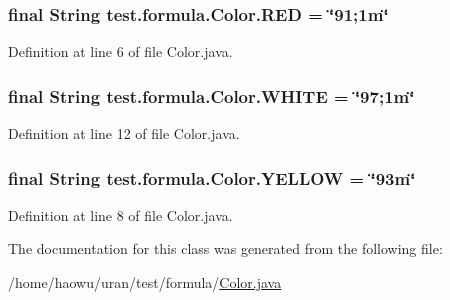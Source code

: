 \hypertarget{classtest_1_1formula_1_1_color_a0c3138b80e11d35744f6ab13c82edff3}{}
\subsubsection[{R\+E\+D}]{\setlength{\rightskip}{0pt plus 5cm}final String test.\+formula.\+Color.\+R\+E\+D = \char`\"{}91;1m\char`\"{}\hspace{0.3cm}{\ttfamily [static]}}\label{classtest_1_1formula_1_1_color_a0c3138b80e11d35744f6ab13c82edff3}


Definition at line 6 of file Color.\+java.

\hypertarget{classtest_1_1formula_1_1_color_a8154969ea2b235189b18cc4844eeb14d}{}
\subsubsection[{W\+H\+I\+T\+E}]{\setlength{\rightskip}{0pt plus 5cm}final String test.\+formula.\+Color.\+W\+H\+I\+T\+E = \char`\"{}97;1m\char`\"{}\hspace{0.3cm}{\ttfamily [static]}}\label{classtest_1_1formula_1_1_color_a8154969ea2b235189b18cc4844eeb14d}


Definition at line 12 of file Color.\+java.

\hypertarget{classtest_1_1formula_1_1_color_a640c4fecc1498ef9aa2ebf43b5aefb8e}{}
\subsubsection[{Y\+E\+L\+L\+O\+W}]{\setlength{\rightskip}{0pt plus 5cm}final String test.\+formula.\+Color.\+Y\+E\+L\+L\+O\+W = \char`\"{}93m\char`\"{}\hspace{0.3cm}{\ttfamily [static]}}\label{classtest_1_1formula_1_1_color_a640c4fecc1498ef9aa2ebf43b5aefb8e}


Definition at line 8 of file Color.\+java.



The documentation for this class was generated from the following file\+:\begin{DoxyCompactItemize}
\item 
/home/haowu/uran/test/formula/\hyperlink{test_2formula_2_color_8java}{Color.\+java}\end{DoxyCompactItemize}
